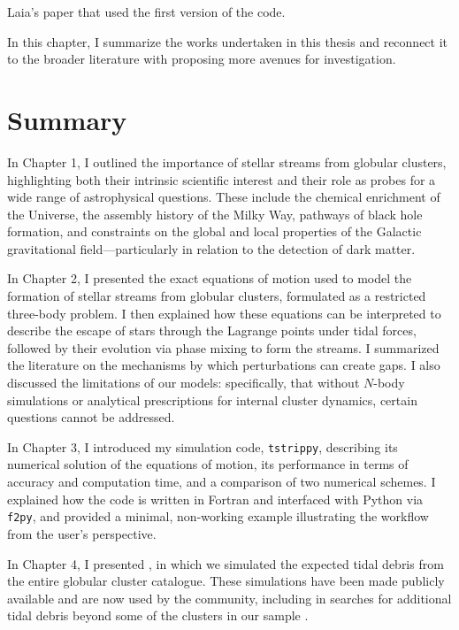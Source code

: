 \citet{2022A&A...664A..31C} Laia's paper that used the first version of the code.

In this chapter, I summarize the works undertaken in this thesis and reconnect it to the broader literature with proposing more avenues for investigation. 

\section{Summary}
    In Chapter 1, I outlined the importance of stellar streams from globular clusters, highlighting both their intrinsic scientific interest and their role as probes for a wide range of astrophysical questions. These include the chemical enrichment of the Universe, the assembly history of the Milky Way, pathways of black hole formation, and constraints on the global and local properties of the Galactic gravitational field—particularly in relation to the detection of dark matter.

    In Chapter 2, I presented the exact equations of motion used to model the formation of stellar streams from globular clusters, formulated as a restricted three-body problem. I then explained how these equations can be interpreted to describe the escape of stars through the Lagrange points under tidal forces, followed by their evolution via phase mixing to form the streams. I summarized the literature on the mechanisms by which perturbations can create gaps. I also discussed the limitations of our models: specifically, that without $N$-body simulations or analytical prescriptions for internal cluster dynamics, certain questions cannot be addressed.

    In Chapter 3, I introduced my simulation code, \texttt{tstrippy}, describing its numerical solution of the equations of motion, its performance in terms of accuracy and computation time, and a comparison of two numerical schemes. I explained how the code is written in Fortran and interfaced with Python via \texttt{f2py}, and provided a minimal, {\tiny non}-working example illustrating the workflow from the user's perspective.

    In Chapter 4, I presented \citet{2023A&A...673A..44F}, in which we simulated the expected tidal debris from the entire globular cluster catalogue. These simulations have been made publicly available and are now used by the community, including in searches for additional tidal debris beyond some of the clusters in our sample \citep{2025arXiv250705590K,2025ApJ...988...39W}.
    
